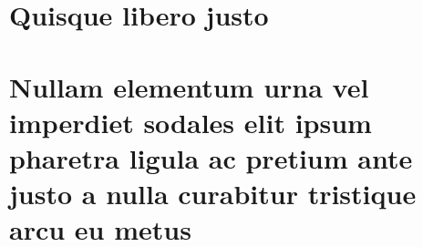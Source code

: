 \documentclass[12pt, oneside, a4paper, brazil]{abntex2}
\begin{document}
    
    
    \postextual
    
    
    
    
    
    \begin{apendicesenv}
    
    \partapendices
    
    \chapter{Quisque libero justo}
    
    \lipsum[50]
    
    \chapter{Nullam elementum urna vel imperdiet sodales elit ipsum pharetra ligula
    ac pretium ante justo a nulla curabitur tristique arcu eu metus}
    \lipsum[55-57]
    
    \end{apendicesenv}
    
    
    
\end{document}
